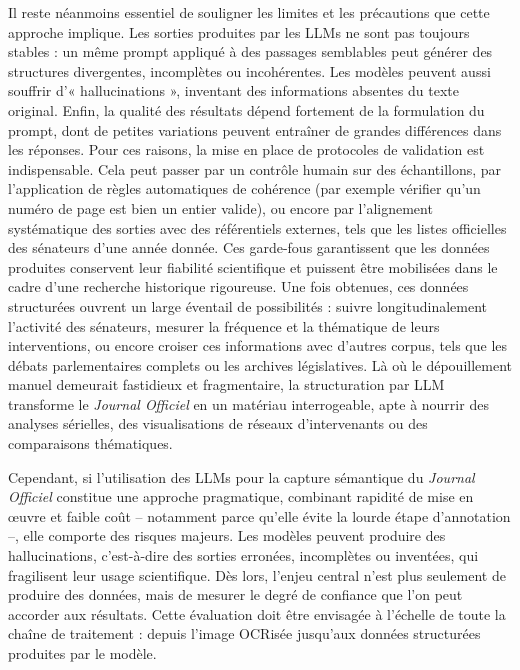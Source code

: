 Il reste néanmoins essentiel de souligner les limites et les précautions que cette approche implique. Les sorties produites par les LLMs ne sont pas toujours stables : un même prompt appliqué à des passages semblables peut générer des structures divergentes, incomplètes ou incohérentes. Les modèles peuvent aussi souffrir d’« hallucinations », inventant des informations absentes du texte original. Enfin, la qualité des résultats dépend fortement de la formulation du prompt, dont de petites variations peuvent entraîner de grandes différences dans les réponses. Pour ces raisons, la mise en place de protocoles de validation est indispensable. Cela peut passer par un contrôle humain sur des échantillons, par l’application de règles automatiques de cohérence (par exemple vérifier qu’un numéro de page est bien un entier valide), ou encore par l’alignement systématique des sorties avec des référentiels externes, tels que les listes officielles des sénateurs d’une année donnée. Ces garde-fous garantissent que les données produites conservent leur fiabilité scientifique et puissent être mobilisées dans le cadre d’une recherche historique rigoureuse. Une fois obtenues, ces données structurées ouvrent un large éventail de possibilités : suivre longitudinalement l’activité des sénateurs, mesurer la fréquence et la thématique de leurs interventions, ou encore croiser ces informations avec d’autres corpus, tels que les débats parlementaires complets ou les archives législatives. Là où le dépouillement manuel demeurait fastidieux et fragmentaire, la structuration par LLM transforme le \emph{Journal Officiel} en un matériau interrogeable, apte à nourrir des analyses sérielles, des visualisations de réseaux d’intervenants ou des comparaisons thématiques.

Cependant, si l’utilisation des LLMs pour la capture sémantique du \emph{Journal Officiel} constitue une approche pragmatique, combinant rapidité de mise en œuvre et faible coût – notamment parce qu’elle évite la lourde étape d’annotation –, elle comporte des risques majeurs. Les modèles peuvent produire des hallucinations, c’est-à-dire des sorties erronées, incomplètes ou inventées, qui fragilisent leur usage scientifique. Dès lors, l’enjeu central n’est plus seulement de produire des données, mais de mesurer le degré de confiance que l’on peut accorder aux résultats. Cette évaluation doit être envisagée à l’échelle de toute la chaîne de traitement : depuis l’image OCRisée jusqu’aux données structurées produites par le modèle.
